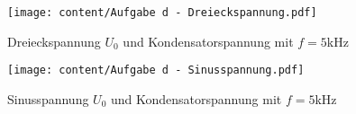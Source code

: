 \begin{figure}
  \centering
  \texttt{[image: content/Aufgabe d - Dreieckspannung.pdf]}
  \caption{Dreieckspannung $U_{0}$ und Kondensatorspannung mit $f=5$kHz}
  \label{fig:aufgabe d - dreieckspannung}
\end{figure}

\begin{figure}
  \centering
  \texttt{[image: content/Aufgabe d - Sinusspannung.pdf]}
  \caption{Sinusspannung $U_{0}$ und Kondensatorspannung mit $f=5$kHz}
  \label{fig:aufgabe d - sinusspannung}
\end{figure}

